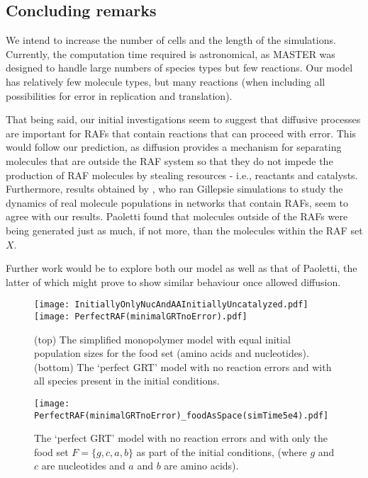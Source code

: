 \documentclass{article}
\begin{document}
{\subsection{Concluding remarks}

We intend to increase the number of cells and the length of the simulations.  Currently, the computation time required is astronomical, as MASTER was designed to handle large numbers of species types but few reactions.  
Our model has relatively few molecule types, but many reactions (when including all possibilities for error in replication and translation).

That being said, our initial investigations seem to suggest that diffusive processes are important for RAFs that contain reactions that can proceed with error.  This would follow our prediction, as diffusion provides a mechanism for separating molecules that are outside the RAF system so that they do not impede the production of RAF molecules by stealing resources - i.e., reactants and catalysts.
Furthermore, results obtained by \cite{Paoletti}, who ran Gillepsie simulations to study the dynamics of real molecule populations in networks that contain RAFs, seem to agree with our results.
Paoletti found that molecules outside of the RAFs were being generated just as much, if not more, than the molecules within the RAF set $X$.

Further work would be to explore both our model as well as that of Paoletti, the latter of which might prove to show similar behaviour once allowed diffusion.

\begin{figure}
    \centering
    	\quad
    	\texttt{[image: InitiallyOnlyNucAndAAInitiallyUncatalyzed.pdf]}
    	\quad
    	\texttt{[image: PerfectRAF(minimalGRTnoError).pdf]}
    \caption{(top) The simplified monopolymer model with equal initial population sizes for the food set (amino acids and nucleotides).  
    (bottom) The `perfect GRT' model with no reaction errors and with all species present in the initial conditions.}
	\label{fig:monopolymer}
\end{figure}

\begin{figure}
    \centering
    	\texttt{[image: PerfectRAF(minimalGRTnoError)\_foodAsSpace(simTime5e4).pdf]}
    \caption{The `perfect GRT' model with no reaction errors and with only the food set $F=\{g,c,a,b\}$ as part of the initial conditions, 
    (where $g$ and $c$ are nucleotides and $a$ and $b$ are amino acids).}
	\label{fig:foodAsSpace}
\end{figure}

}
\end{document}
